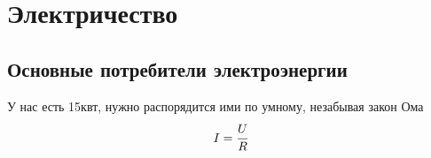 \part{Электричество}
\chapter{Основные потребители электроэнергии}
У нас есть 15квт, нужно распорядится ими по умному, незабывая закон Ома $$ I = \cfrac{U}{R} $$
